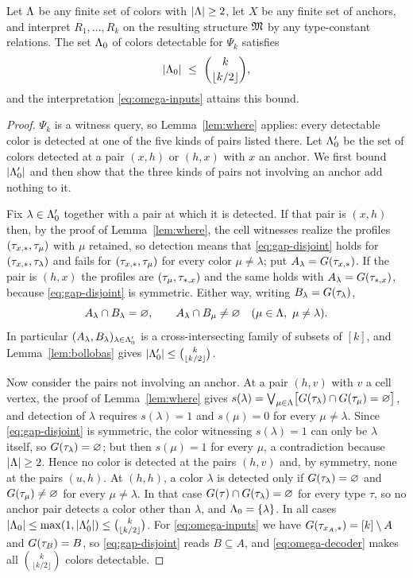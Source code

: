 \begin{proposition}\label{prop:middle-layer}
Let $\Lambda$ be any finite set of colors with $|\Lambda|\ge2$, let $X$ be any
finite set of anchors, and interpret $R_1,\ldots,R_k$ on the resulting
structure $\mathfrak M$ by any type-constant relations. The set $\Lambda_0$ of colors
detectable for $\Psi_k$ satisfies
\[
 |\Lambda_0|\ \le\ \binom{k}{\lfloor k/2\rfloor},
\]
and the interpretation \eqref{eq:omega-inputs} attains this bound.
\end{proposition}
\begin{proof}
$\Psi_k$ is a witness query, so Lemma~\ref{lem:where} applies: every
detectable color is detected at one of the five kinds of pairs listed there.
Let $\Lambda_0'$ be the set of colors detected at a pair $(x,h)$ or $(h,x)$ with
$x$ an anchor. We first bound $|\Lambda_0'|$ and then show that the three kinds
of pairs not involving an anchor add nothing to it.

Fix $\lambda\in\Lambda_0'$ together with a pair at which it is detected. If that
pair is $(x,h)$ then, by the proof of Lemma~\ref{lem:where}, the cell
witnesses realize the profiles $(\tau_{x,\ast},\tau_{\mu})$ with $\mu$ retained, so
detection means that \eqref{eq:gap-disjoint} holds for
$(\tau_{x,\ast},\tau_{\lambda})$ and fails for $(\tau_{x,\ast},\tau_{\mu})$ for every color
$\mu\ne\lambda$; put $A_\lambda=G(\tau_{x,\ast})$. If the pair is $(h,x)$ the
profiles are $(\tau_{\mu},\tau_{\ast,x})$ and the same holds with
$A_\lambda=G(\tau_{\ast,x})$, because \eqref{eq:gap-disjoint} is symmetric. Either
way, writing $B_\lambda=G(\tau_{\lambda})$,
\[
 A_\lambda\cap B_\lambda=\varnothing,\qquad
 A_\lambda\cap B_\mu\ne\varnothing\quad(\mu\in\Col,\ \mu\ne\lambda).
\]
In particular $(A_\lambda,B_\lambda)_{\lambda\in\Lambda_0'}$ is a
cross-intersecting family of subsets of $[k]$, and
Lemma~\ref{lem:bollobas} gives $|\Lambda_0'|\le\binom{k}{\lfloor k/2\rfloor}$.

Now consider the pairs not involving an anchor. At a pair $(h,v)$ with $v$ a
cell vertex, the proof of Lemma~\ref{lem:where} gives
$s(\lambda)=\bigvee_{\mu\in\Lambda}\bigl[G(\tau_{\lambda})\cap
G(\tau_{\mu})=\varnothing\bigr]$, and detection of $\lambda$ requires
$s(\lambda)=1$ and $s(\mu)=0$ for every $\mu\ne\lambda$. Since
\eqref{eq:gap-disjoint} is symmetric, the color witnessing $s(\lambda)=1$
can only be $\lambda$ itself, so $G(\tau_{\lambda})=\varnothing$; but then
$s(\mu)=1$ for every $\mu$, a contradiction because $|\Lambda|\ge2$. Hence no
color is detected at the pairs $(h,v)$ and, by symmetry, none at the pairs
$(u,h)$. At $(h,h)$, a color $\lambda$ is detected only if
$G(\tau_{\lambda})=\varnothing$ and $G(\tau_{\mu})\ne\varnothing$ for every
$\mu\ne\lambda$. In that case $G(\tau)\cap G(\tau_{\lambda})=\varnothing$ for
every type $\tau$, so no anchor pair detects a color other than $\lambda$,
and $\Lambda_0=\{\lambda\}$. In all cases
$|\Lambda_0|\le\max(1,|\Lambda_0'|)\le\binom{k}{\lfloor k/2\rfloor}$. For
\eqref{eq:omega-inputs} we have $G(\tau_{x_A,\ast})=[k]\setminus A$ and
$G(\tau_{B})=B$, so \eqref{eq:gap-disjoint} reads $B\subseteq A$, and
\eqref{eq:omega-decoder} makes all $\binom{k}{\lfloor k/2\rfloor}$ colors
detectable.
\end{proof}
